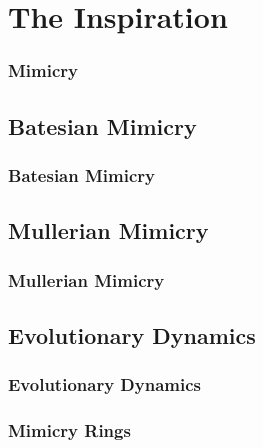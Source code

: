 \section{The Inspiration}

\frame
{
	\frametitle{Mimicry}
}

\subsection{Batesian Mimicry}

\frame
{
	\frametitle{Batesian Mimicry}
}

\subsection{Mullerian Mimicry}

\frame
{
	\frametitle{Mullerian Mimicry}
}

\subsection{Evolutionary Dynamics}

\frame
{
	\frametitle{Evolutionary Dynamics}
}

\frame
{
	\frametitle{Mimicry Rings}
}